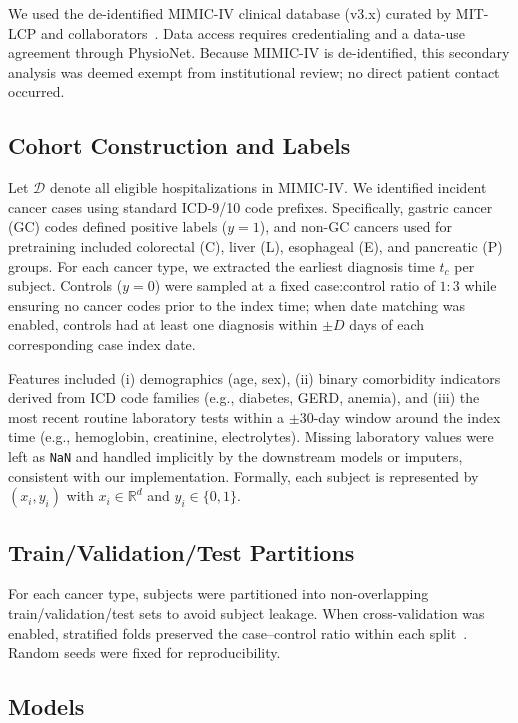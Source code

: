 \documentclass[journal,article,submit,pdftex,moreauthors]{Definitions/mdpi}
\begin{document}
We used the de-identified MIMIC-IV clinical database (v3.x) curated by MIT-LCP and collaborators~\citep{Johnson2023_MIMICIV}. Data access requires credentialing and a data-use agreement through PhysioNet. Because MIMIC-IV is de-identified, this secondary analysis was deemed exempt from institutional review; no direct patient contact occurred.

\subsection{Cohort Construction and Labels}

Let $\mathcal{D}$ denote all eligible hospitalizations in MIMIC-IV. We identified incident cancer cases using standard ICD-9/10 code prefixes. Specifically, gastric cancer (GC) codes defined positive labels ($y{=}1$), and non-GC cancers used for pretraining included colorectal (C), liver (L), esophageal (E), and pancreatic (P) groups. For each cancer type, we extracted the earliest diagnosis time $t_c$ per subject. Controls ($y{=}0$) were sampled at a fixed case:control ratio of $1{:}3$ while ensuring no cancer codes prior to the index time; when date matching was enabled, controls had at least one diagnosis within $\pm D$ days of each corresponding case index date.

Features included (i) demographics (age, sex), (ii) binary comorbidity indicators derived from ICD code families (e.g., diabetes, GERD, anemia), and (iii) the most recent routine laboratory tests within a \mbox{$\pm 30$-day} window around the index time (e.g., hemoglobin, creatinine, electrolytes). Missing laboratory values were left as \texttt{NaN} and handled implicitly by the downstream models or imputers, consistent with our implementation. Formally, each subject is represented by $(x_i,y_i)$ with $x_i\in\mathbb{R}^d$ and $y_i\in\{0,1\}$.

\subsection{Train/Validation/Test Partitions}

For each cancer type, subjects were partitioned into non-overlapping train/validation/test sets to avoid subject leakage. When cross-validation was enabled, stratified folds preserved the case--control ratio within each split~\citep{Pedregosa2011_sklearn}. Random seeds were fixed for reproducibility.

\subsection{Models}
\end{document}
